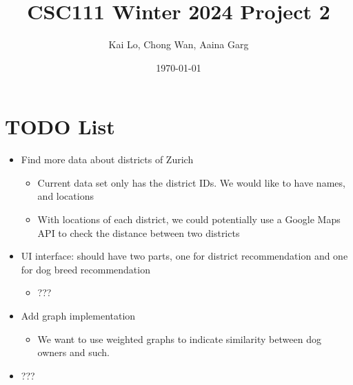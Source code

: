 \documentclass[11pt]{article}
\title{CSC111 Winter 2024 Project 2}
\author{Kai Lo, Chong Wan, Aaina Garg}
\date{\today}
\begin{document}
\maketitle

\section*{TODO List}
\begin{itemize}
\item Find more data about districts of Zurich
\begin{itemize}
	\item Current data set only has the district IDs. We would like to have names, and locations
	\item With locations of each district, we could potentially use a Google Maps API to check the distance between two districts
\end{itemize}
\item UI interface: should have two parts, one for district recommendation and one for dog breed recommendation
\begin{itemize}
	\item ???
\end{itemize}
\item Add graph implementation
\begin{itemize}
	\item We want to use weighted graphs to indicate similarity between dog owners and such.
\end{itemize}
\item ???
\end{itemize}
\end{document}
